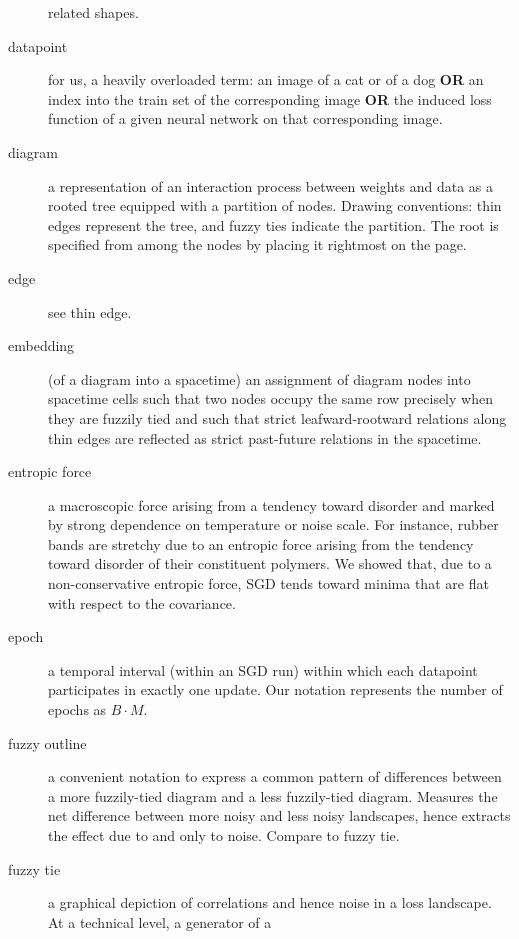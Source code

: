 \documentclass{article}
\theoremstyle{plain}
\theoremstyle{definition}
\begin{document}
\begin{description}
            related shapes. 
        \item[datapoint] for us, a heavily overloaded term: an image of a cat
            or of a dog {\bf OR} an index into the train set of the
            corresponding image {\bf OR} the induced loss function of a given
            neural network on that corresponding image.  
        \item[diagram] a representation of an interaction process between
            weights and data as a rooted tree equipped with a partition of
            nodes.  Drawing conventions: thin edges represent the tree, and
            fuzzy ties indicate the partition.  The root is specified from
            among the nodes by placing it rightmost on the page.
        \item[edge] see thin edge.
        \item[embedding] (of a diagram into a spacetime) an assignment of
            diagram nodes into spacetime cells such that two nodes occupy the
            same row precisely when they are fuzzily tied and such that strict
            leafward-rootward relations along thin edges are reflected as
            strict past-future relations in the spacetime.
        \item[entropic force] a macroscopic force arising from a tendency
            toward disorder and marked by strong dependence on temperature or
            noise scale.  For instance, rubber bands are stretchy due to an
            entropic force arising from the tendency toward disorder of their
            constituent polymers.  We showed that, due to a non-conservative
            entropic force, SGD tends toward minima that are flat with respect
            to the covariance. 
        \item[epoch] a temporal interval (within an SGD run) within which each
            datapoint participates in exactly one update.  Our notation
            represents the number of epochs as $B\cdot M$.
        \item[fuzzy outline] a convenient notation to express a common pattern
            of differences between a more fuzzily-tied diagram and a less
            fuzzily-tied diagram.  Measures the net difference between
            more noisy and less noisy landscapes, hence extracts the effect due
            to and only to noise.  Compare to fuzzy tie.
        \item[fuzzy tie] a graphical depiction of correlations and hence noise
            in a loss landscape.  At a technical level, a generator of a

\end{description}
\end{document}
